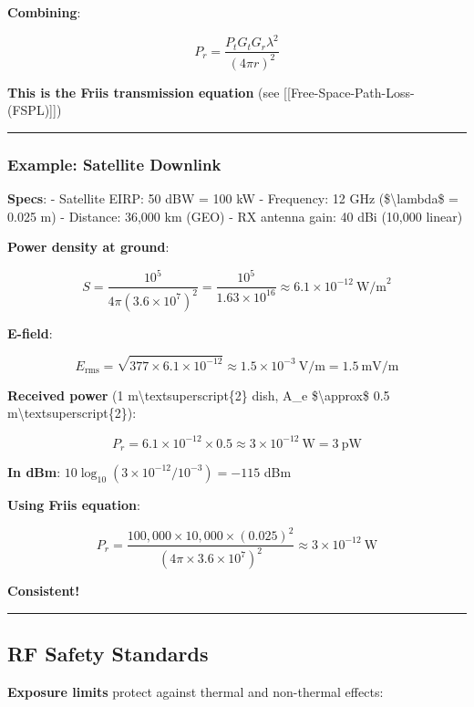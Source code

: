 \textbf{Combining}:

\[
P_r = \frac{P_t G_t G_r \lambda^2}{(4\pi r)^2}
\]

\textbf{This is the Friis transmission equation} (see
{[}{[}Free-Space-Path-Loss-(FSPL){]}{]})

\begin{center}\rule{0.5\linewidth}{0.5pt}\end{center}

\subsubsection{Example: Satellite
Downlink}\label{example-satellite-downlink}

\textbf{Specs}: - Satellite EIRP: 50 dBW = 100 kW - Frequency: 12 GHz
(\$\textbackslash lambda\$ = 0.025 m) - Distance: 36,000 km (GEO) - RX
antenna gain: 40 dBi (10,000 linear)

\textbf{Power density at ground}:

\[
S = \frac{10^5}{4\pi (3.6 \times 10^7)^2} = \frac{10^5}{1.63 \times 10^{16}} \approx 6.1 \times 10^{-12}\ \text{W/m}^2
\]

\textbf{E-field}:

\[
E_{\text{rms}} = \sqrt{377 \times 6.1 \times 10^{-12}} \approx 1.5 \times 10^{-3}\ \text{V/m} = 1.5\ \text{mV/m}
\]

\textbf{Received power} (1 m\textbackslash textsuperscript\{2\} dish,
A\_e \$\textbackslash approx\$ 0.5
m\textbackslash textsuperscript\{2\}):

\[
P_r = 6.1 \times 10^{-12} \times 0.5 \approx 3 \times 10^{-12}\ \text{W} = 3\ \text{pW}
\]

\textbf{In dBm}: \(10\log_{10}(3 \times 10^{-12} / 10^{-3}) = -115\) dBm

\textbf{Using Friis equation}:

\[
P_r = \frac{100,000 \times 10,000 \times (0.025)^2}{(4\pi \times 3.6 \times 10^7)^2} \approx 3 \times 10^{-12}\ \text{W}
\]

\textbf{Consistent!}

\begin{center}\rule{0.5\linewidth}{0.5pt}\end{center}

\subsection{RF Safety Standards}\label{rf-safety-standards}

\textbf{Exposure limits} protect against thermal and non-thermal
effects:

